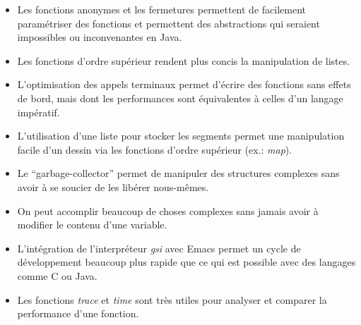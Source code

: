 \documentclass[10pt]{report}
\begin{document}
\begin{itemize}
\item Les fonctions anonymes et les fermetures permettent de
  facilement paramétriser des fonctions et permettent des abstractions
  qui seraient impossibles ou inconvenantes en Java.
\item Les fonctions d'ordre supérieur rendent plus concis la
  manipulation de listes.
\item L'optimisation des appels terminaux permet d'écrire des
  fonctions sans effets de bord, mais dont les performances sont
  équivalentes à celles d'un langage impératif.
\item L'utilisation d'une liste pour stocker les segments permet une
  manipulation facile d'un dessin via les fonctions d'ordre supérieur
  (ex.: \emph{map}).
\item Le ``garbage-collector'' permet de manipuler des structures
  complexes sans avoir à se soucier de les libérer nous-mêmes.
\item On peut accomplir beaucoup de choses complexes sans jamais avoir
  à modifier le contenu d'une variable.
\item L'intégration de l'interpréteur \emph{gsi} avec Emacs permet un
  cycle de développement beaucoup plus rapide que ce qui est possible
  avec des langages comme C ou Java.
\item Les fonctions \emph{trace} et \emph{time} sont très utiles pour
  analyser et comparer la performance d'une fonction.
\end{itemize}
\end{document}
